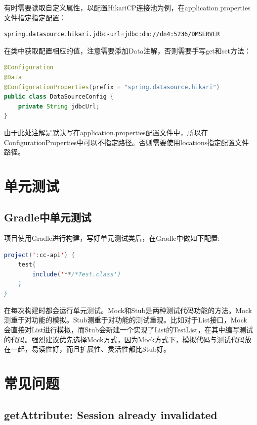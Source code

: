 \documentclass[letter]{book}
\begin{document}
有时需要读取自定义属性，以配置HikariCP连接池为例，在application.properties文件指定指定配置：

\begin{lstlisting}
spring.datasource.hikari.jdbc-url=jdbc:dm://dn4:5236/DMSERVER
\end{lstlisting}

在类中获取配置相应的值，注意需要添加Data注解，否则需要手写get和set方法：

\begin{lstlisting}[language=Java]
@Configuration
@Data
@ConfigurationProperties(prefix = "spring.datasource.hikari")
public class DataSourceConfig {
	private String jdbcUrl;
}
\end{lstlisting}

由于此处注解是默认写在application.properties配置文件中，所以在ConfigurationProperties中可以不指定路径。否则需要使用locations指定配置文件路径。

\section{单元测试}

\subsection{Gradle中单元测试}

项目使用Gradle进行构建，写好单元测试类后，在Gradle中做如下配置:

\begin{lstlisting}[language=Java]
project(':cc-api') {	
	test{
		include('**/*Test.class')
	}
}
\end{lstlisting}

在每次构建时都会运行单元测试。Mock和Stub是两种测试代码功能的方法。Mock测重于对功能的模拟。Stub测重于对功能的测试重现。比如对于List接口，Mock会直接对List进行模拟，而Stub会新建一个实现了List的TestList，在其中编写测试的代码。强烈建议优先选择Mock方式，因为Mock方式下，模拟代码与测试代码放在一起，易读性好，而且扩展性、灵活性都比Stub好。


\section{常见问题}

\subsection{getAttribute: Session already invalidated}
\end{document}
